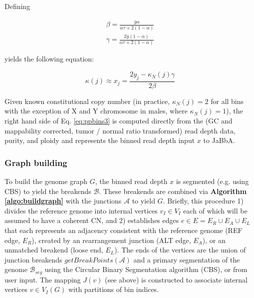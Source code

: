 \documentclass[phd,tocprelim]{cornell}
\begin{document}
Defining

\begin{equation} \label{eq:purityploidycorrection}
    \begin{split}
        \beta = \frac{\bar{y}\alpha}{\alpha\tau+2(1-\alpha)} \\
        \gamma = \frac{2\bar{y}(1-\alpha)}{\alpha\tau+2(1-\alpha)}
    \end{split}
\end{equation}

yields the following equation:

\begin{equation} \label{eq:ppbins3}
    \kappa(j) \approx x_j = \frac{2y_j - \kappa_N(j)\gamma}{2\beta}
\end{equation}

Given known constitutional copy number (in practice, $\kappa_N(j) = 2$ for all bins with the exception of X and Y chromosome in males, where $\kappa_N(j) = 1$), the right hand side of Eq. \ref{eq:ppbins3} is computed directly from the (GC and mappability corrected, tumor / normal ratio transformed) read depth data, purity, and ploidy and represents the binned read depth input $x$ to JaBbA.

\subsubsection*{Graph building}
To build the genome graph $G$, the binned read depth $x$ is segmented (e.g. using CBS) to yield the breakends $\mathcal{B}$.  These breakends are combined via \textbf{Algorithm \ref{algo:buildgraph}} with the junctions $\mathcal{A}$ to yield $G$.  Briefly, this procedure 1) divides the reference genome into internal vertices $v_I \in V_I$ each of which will be assumed to have a coherent CN, and 2) establishes edges $e \in E=E_{R} \cup E_{A} \cup E_{L}$ that each represents an adjacency consistent with the reference genome (REF edge, $E_R$), created by an rearrangement junction (ALT edge, $E_A$), or an unmatched breakend (loose end, $E_L$). The ends of the vertices are the union of junction breakends $getBreakPoints(\mathcal{A})$ and a primary segmentation of the genome $\mathcal{B}_{seg}$ using the Circular Binary Segmentation algorithm \cite{olshen2004} (CBS), or from user input.  The mapping $J(v)$ (see above) is constructed to associate internal vertices $v \in V_I(G)$ with partitions of bin indices.
\end{document}
